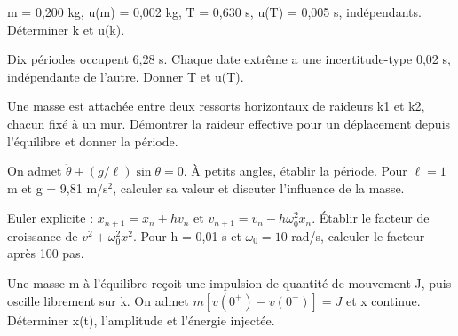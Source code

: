 \begin{questions}
\item m = 0,200 kg, u(m) = 0,002 kg, T = 0,630 s, u(T) = 0,005 s, indépendants. Déterminer k et u(k).
\end{questions}

\begin{questions}
\item Dix périodes occupent 6,28 s. Chaque date extrême a une incertitude-type 0,02 s, indépendante de l’autre. Donner T et u(T).
\end{questions}

\begin{questions}
\item Une masse est attachée entre deux ressorts horizontaux de raideurs k1 et k2, chacun fixé à un mur. Démontrer la raideur effective pour un déplacement depuis l’équilibre et donner la période.
\end{questions}



\begin{questions}
\item On admet $\ddot\theta+(g/\ell)\sin\theta=0$. À petits angles, établir la période. Pour $\ell=1$ m et g = 9,81 m/s$^2$, calculer sa valeur et discuter l’influence de la masse.
\end{questions}

\begin{questions}
\item Euler explicite : $x_{n+1}=x_n+hv_n$ et $v_{n+1}=v_n-h\omega_0^2x_n$. Établir le facteur de croissance de $v^2+\omega_0^2x^2$. Pour h = 0,01 s et $\omega_0=10$ rad/s, calculer le facteur après 100 pas.
\end{questions}

\begin{questions}
\item Une masse m à l’équilibre reçoit une impulsion de quantité de mouvement J, puis oscille librement sur k. On admet $m[v(0^+)-v(0^-)]=J$ et x continue. Déterminer x(t), l’amplitude et l’énergie injectée.
\end{questions}



